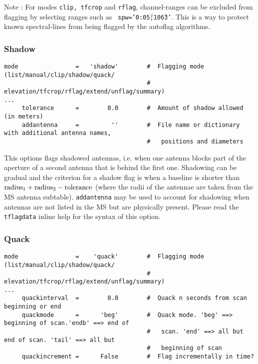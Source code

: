 Note : For modes {\tt clip, tfcrop} and {\tt rflag}, channel-ranges
can be excluded from flagging by selecting ranges such as {\tt
  spw='0:0\~5;10\~63'}. This is a way to protect known spectral-lines
from being flagged by the autoflag algorithms.


\subsubsection{Shadow}
\label{section:edit.tflagdata.mode.shadow}

\small
\begin{verbatim}
mode                =   'shadow'        #  Flagging mode (list/manual/clip/shadow/quack/
                                        #  elevation/tfcrop/rflag/extend/unflag/summary)
...
     tolerance      =        0.0        #  Amount of shadow allowed (in meters)
     addantenna     =         ''        #  File name or dictionary with additional antenna names,
                                        #   positions and diameters
\end{verbatim}

\normalsize 

This options flags shadowed antennas, i.e. when one antenna blocks
part of the aperture of a second antenna that is behind the first
one. Shadowing can be gradual and the criterion for a shadow flag is
when a baseline is shorter than ${\rm radius}_1 + {\rm radius}_2 - {\rm tolerance}$
(where the radii of the antennae are taken from the MS antenna
subtable). {\tt addantenna} may be used to account for shadowing when
antennas are not listed in the MS but are physically present. Please
read the {\tt tflagdata} inline help for the syntax of this option.


\subsubsection{Quack}
\label{section:edit.tflagdata.mode.quack}
\small
\begin{verbatim}
mode                =    'quack'        #  Flagging mode (list/manual/clip/shadow/quack/
                                        #   elevation/tfcrop/rflag/extend/unflag/summary)
...
     quackinterval  =        0.0        #  Quack n seconds from scan beginning or end
     quackmode      =      'beg'        #  Quack mode. 'beg' ==> beginning of scan.'endb' ==> end of
                                        #   scan. 'end' ==> all but end of scan. 'tail' ==> all but
                                        #   beginning of scan
     quackincrement =      False        #  Flag incrementally in time?
\end{verbatim}
\normalsize

